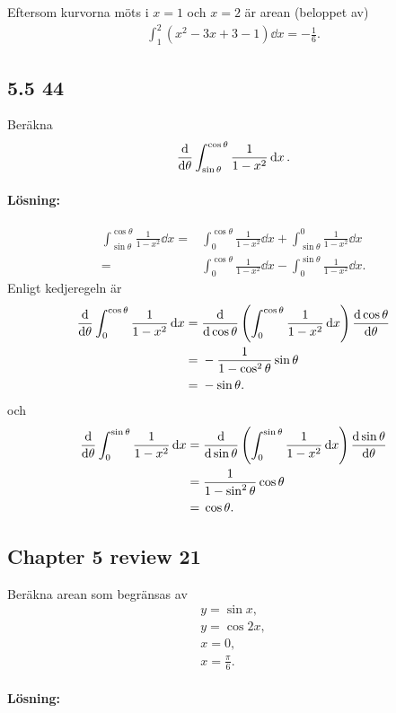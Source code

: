 ~\\
\\
Eftersom kurvorna möts i $x = 1$ och $x = 2$ är arean (beloppet av)
\begin{align*}
	\int_1^2 (x^2 - 3 x + 3 - 1) \dd{x} = -\frac{1}{6}.
\end{align*}

\subsection{5.5 44}%
\label{sub:5_5_44}

Beräkna
\begin{align*}
	\derivative{}{\theta} \int_{\sin \theta}^{\cos \theta} \frac{1}{1 - x^2} \dd{x}.
\end{align*}

\paragraph{Lösning:}

\begin{align*}
	\int_{\sin \theta}^{\cos \theta} \frac{1}{1 - x^2} \dd{x} ={}&
	\int_{0}^{\cos \theta} \frac{1}{1 - x^2} \dd{x}
	+ \int_{\sin \theta}^{0} \frac{1}{1 - x^2} \dd{x}\\
	={}& \int_{0}^{\cos \theta} \frac{1}{1 - x^2} \dd{x}
	- \int_{0}^{\sin \theta} \frac{1}{1 - x^2} \dd{x}.
\end{align*}
Enligt kedjeregeln är
\begin{align*}
	\derivative{}{\theta} \int_{0}^{\cos \theta} \frac{1}{1 - x^2} \dd{x} ={}&
	\derivative{}{\cos \theta} \left(\int_{0}^{\cos \theta} \frac{1}{1 - x^2} \dd{x}\right) \derivative{\cos \theta}{\theta}\\
	={}& -\frac{1}{1 - \cos^2 \theta} \sin \theta\\
	={}& -\sin \theta.
\end{align*}
och
\begin{align*}
	\derivative{}{\theta} \int_{0}^{\sin \theta} \frac{1}{1 - x^2} \dd{x} ={}&
	\derivative{}{\sin \theta} \left(\int_{0}^{\sin \theta} \frac{1}{1 - x^2} \dd{x}\right) \derivative{\sin \theta}{\theta}\\
	={}& \frac{1}{1 - \sin^2 \theta} \cos \theta\\
	={}& \cos \theta.
\end{align*}


\subsection{Chapter 5 review 21}%
\label{sub:chapter_5_review_21}

Beräkna arean som begränsas av
\begin{align*}
	y = \sin x,\\
	y = \cos 2 x,\\
	x = 0,\\
	x = \frac{\pi}{6}.
\end{align*}

\paragraph{Lösning:}

~


